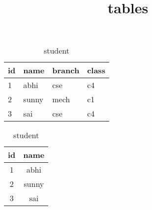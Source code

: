 \documentclass{article}
\title{tables}
\begin{document}
	\maketitle

	\begin{table}[h]
	
		\begin{tabular}{|p{5cm}|p{5cm}|p{5cm}|p{5cm}}
			\hline
			\textbf{id} & \textbf{name} & \textbf{branch} & \textbf{class} \\
			\hline
			1 & abhi & cse & c4 \\
			\hline
			2  & sunny & mech & c1 \\
			\hline
			3 & sai & cse & c4 \\
			\hline
			 
			
		\end{tabular}
	\caption{student }
	\end{table}
	\begin{table}[h]
	\centering
	\begin{tabular}{|c|c|}
		\hline
		\cellcolor{yellow}  \textbf{id} & \cellcolor{pink} \textbf{name}  \\
		\hline
		\cellcolor{red}    1 &  \cellcolor{blue}   abhi \\
		\hline
		2  & sunny \\
		\hline
		3 & sai \\
		\hline
		
		
	\end{tabular}
	\caption{student }
\end{table}
\end{document}
